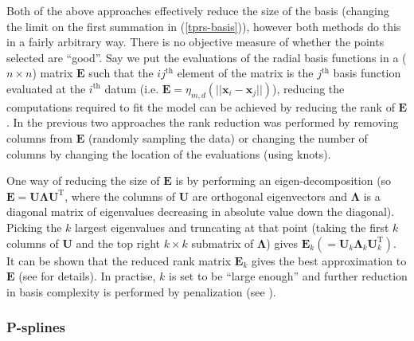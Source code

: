 Both of the above approaches effectively reduce the size of the basis (changing the limit on the first summation in (\ref{tprs-basis})), however both methods do this in a fairly arbitrary way. There is no objective measure of whether the points selected are ``good''. Say we put the evaluations of the radial basis functions in a ($n \times n$) matrix $\mathbf{E}$ such that the $ij^\text{th}$ element of the matrix is the $j^\text{th}$ basis function evaluated at the $i^\text{th}$ datum (i.e. $\mathbf{E} = \eta_{m,d}\left (\vert\vert\mathbf{x}_i - \mathbf{x}_j \vert\vert \right )$), reducing the computations required to fit the model can be achieved by reducing the rank of $\mathbf{E}$. In the previous two approaches the rank reduction was performed by removing columns from $\mathbf{E}$ (randomly sampling the data) or changing the number of columns by changing the location of the evaluations (using knots). 

One way of reducing the size of $\mathbf{E}$ is by performing an eigen-decomposition (so $\mathbf{E}=\mathbf{U}\mathbf{\Lambda}\mathbf{U}^\text{T}$, where the columns of $\mathbf{U}$ are orthogonal eigenvectors and $\mathbf{\Lambda}$ is a diagonal matrix of eigenvalues decreasing in absolute value down the diagonal). Picking the $k$ largest eigenvalues and truncating at that point (taking the first $k$ columns of $\mathbf{U}$ and the top right $k\times k$ submatrix of $\mathbf{\Lambda}$) gives $\mathbf{E}_k(=\mathbf{U}_k\mathbf{\Lambda}_k\mathbf{U}_k^\text{T})$. It can be shown that the reduced rank matrix $\mathbf{E}_k$ gives the best approximation to $\mathbf{E}$ (see \cite{wood2003} for details). In practise, $k$ is set to be ``large enough'' and further reduction in basis complexity is performed by penalization (see ).

\subsubsection{P-splines}
\label{intro-psplines}

